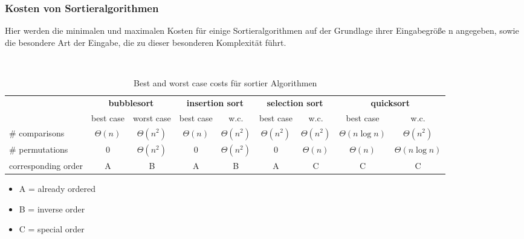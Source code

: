 \documentclass[a4paper]{article}
\begin{document}
    \subsubsection{Kosten von Sortieralgorithmen}
    Hier werden die minimalen und maximalen Kosten für einige Sortieralgorithmen auf der Grundlage ihrer Eingabegröße n angegeben, sowie die besondere Art der Eingabe, die zu dieser besonderen Komplexität führt.
    \begin{table}[H]
      \centering
      \footnotesize
      \caption{Best and worst case costs für sortier Algorithmen}
      \label{Sorting 1}
      ~\\
      \hspace{-1.6cm}
      \begin{tabular}{|l | c c | c c | c c | c c |}
        \cline{2-9}
        \multicolumn{1}{c|}{} & \multicolumn{2}{c|}{\textbf{bubblesort}} & \multicolumn{2}{c|}{\textbf{insertion sort}} & \multicolumn{2}{c|}{\textbf{selection sort}} & \multicolumn{2}{c|}{\textbf{quicksort}} \\
        \multicolumn{1}{c|}{}             & best case                & worst case                & best case                  & w.c.                  & best case                  & w.c.                  & best case               & w.c.               \\
        \hline
        \# comparisons  & $\Theta(n)$                  & $\Theta(n^2)$                  & $\Theta(n)$                    & $\Theta(n^2)$                    & $\Theta(n^2)$                    & $\Theta(n^2)$                    & $\Theta(n \log n)$                                  & $\Theta(n^2)$                 \\
        \# permutations & $0$                   & $\Theta(n^2)$                  & $0$                     & $\Theta(n^2)$                    & $0$                     & $\Theta(n)$                    & $\Theta(n)$                   & $\Theta(n \log n)$                 \\
        \hline
        corresponding order             & A                 & B                 & A                   & B & A                   & C                   & C                    & C                 \\
        \hline
      \end{tabular}
      \begin{itemize}
      \item A = already ordered
      \item B = inverse order
      \item C = special order
      \end{itemize}
    
    
    \end{table}
    
\end{document}
